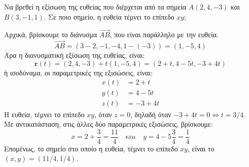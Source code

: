 \begin{example}\label{ex:line2}
  Να βρεθεί η εξίσωση της ευθείας που διέρχεται από τα σημεία $ Α(2,4,-3) $ και 
  $ B(3,-1,1) $. Σε ποιο σημείο, η ευθεία τέμνει το επίπεδο $ xy $; 
\end{example}
\begin{solution}
  Αρχικά, βρίσκουμε το διάνυσμα $ \vec{AB} $, που είναι παράλληλο με την ευθεία.
  \[ \vec{AB} = (3-2,-1,-4,1-(-3)) = (1,-5,4) \]
  Άρα η διανυσματική εξίσωση της ευθείας, είναι:
  \[
    \mathbf{r}(t) = (2,4,-3) + t(1,-5,4) = (2+t,4-5t,-3+4t)
  \] 
  ή ισοδύναμα, οι παραμετρικές της εξισώσεις, είναι:
  \begin{align*}
    x(t) &= 2+t \\
    y(t) &= 4-5t \\
    z(t) &= -3+4t
  \end{align*} 
  Η ευθεία, τέμνει το επίπεδο $ xy $, όταν $ z=0 $, δηλαδή όταν $ -3+4t=0
  \Leftrightarrow t = 3/4 $. Με αντικατάσταση, στις άλλες δύο παραμετρικές εξισώσεις, 
  βρίσκουμε:
  \[
    x = 2+ \frac{3}{4} = \frac{11}{4} \quad \text{και} \quad y = 4- 5\frac{3}{4} = 
    \frac{1}{4}  
  \]
  Επομένως, το σημείο στο οποίο η ευθεία, τέμνει το επίπεδο $ xy $, είναι το 
  $ (x,y) = (11/4,1/4) $.
\end{solution}

